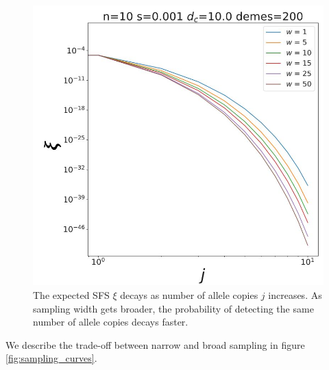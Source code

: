 \begin{figure}[H]
    \centering
    \hspace*{-1.5cm}
    \includegraphics[scale=0.5]{img/sfs.JPG}
    \caption{The expected SFS $\xi$ decays as number of allele copies $j$ increases. As sampling width gets broader, the probability of detecting the same number of allele copies decays faster.}
    \label{fig:sfs}
\end{figure}


We describe the trade-off between narrow and broad sampling in figure \ref{fig:sampling_curves}. 

